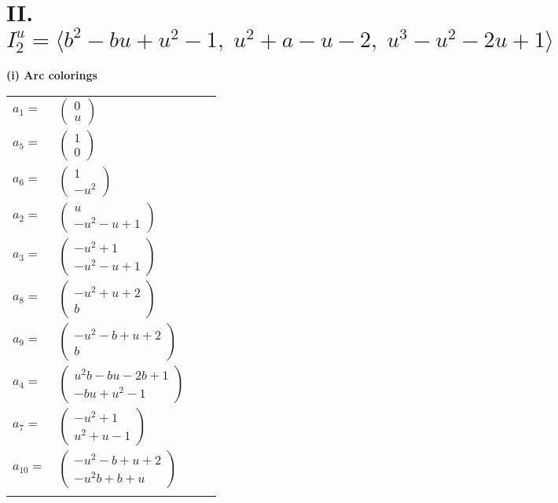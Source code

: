 \documentclass[1p]{elsarticle_modified}
\theoremstyle{definition}
\begin{document}
\centering \section*{II. $I^u_{2}= \langle b^2- b u+u^2-1,\;u^2+a- u-2,\;u^3- u^2-2 u+1 \rangle$}
\flushleft \textbf{(i) Arc colorings}\\
\begin{tabular}{m{7pt} m{180pt} m{7pt} m{180pt} }
\flushright $a_{1}=$&$\begin{pmatrix}0\\u\end{pmatrix}$ \\
\flushright $a_{5}=$&$\begin{pmatrix}1\\0\end{pmatrix}$ \\
\flushright $a_{6}=$&$\begin{pmatrix}1\\- u^2\end{pmatrix}$ \\
\flushright $a_{2}=$&$\begin{pmatrix}u\\- u^2- u+1\end{pmatrix}$ \\
\flushright $a_{3}=$&$\begin{pmatrix}- u^2+1\\- u^2- u+1\end{pmatrix}$ \\
\flushright $a_{8}=$&$\begin{pmatrix}- u^2+u+2\\b\end{pmatrix}$ \\
\flushright $a_{9}=$&$\begin{pmatrix}- u^2- b+u+2\\b\end{pmatrix}$ \\
\flushright $a_{4}=$&$\begin{pmatrix}u^2 b- b u-2 b+1\\- b u+u^2-1\end{pmatrix}$ \\
\flushright $a_{7}=$&$\begin{pmatrix}- u^2+1\\u^2+u-1\end{pmatrix}$ \\
\flushright $a_{10}=$&$\begin{pmatrix}- u^2- b+u+2\\- u^2 b+b+u\end{pmatrix}$\\&\end{tabular}
\end{document}
